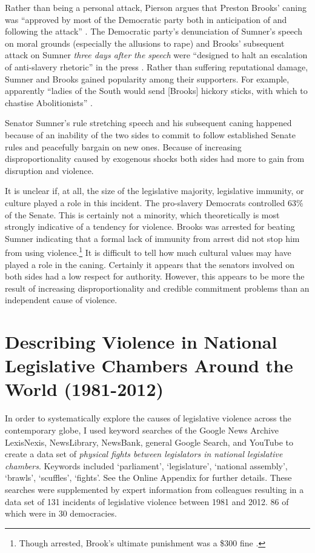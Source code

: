 \documentclass[a4paper]{article}\usepackage[]{graphicx}\usepackage[]{color}
\begin{document}
Rather than being a personal attack, Pierson argues that Preston Brooks' caning was ``approved by most of the Democratic party both in anticipation of and following the attack'' \cite[553]{Pierson1995}. The Democratic party's denunciation of Sumner's speech on moral grounds (especially the allusions to rape) and Brooks' subsequent attack on Sumner \emph{three days after the speech} were ``designed to halt an escalation of anti-slavery rhetoric'' in the press \cite[553]{Pierson1995}. Rather than suffering reputational damage, Sumner and Brooks gained popularity among their supporters. For example, apparently ``ladies of the South would send [Brooks] hickory sticks, with which to chastise Abolitionists'' \cite[255]{Donald2009}.

Senator Sumner's rule stretching speech and his subsequent caning happened because of an inability of the two sides to commit to follow established Senate rules and peacefully bargain on new ones. Because of increasing disproportionality caused by exogenous shocks both sides had more to gain from disruption and violence.

It is unclear if, at all, the size of the legislative majority, legislative immunity, or culture played a role in this incident. The pro-slavery Democrats controlled 63\% of the Senate. This is certainly not a minority, which theoretically is most strongly indicative of a tendency for violence. Brooks was arrested for beating Sumner indicating that a formal lack of immunity from arrest did not stop him from using violence.\footnote{Though arrested, Brook's ultimate punishment was a \$300 fine \cite[59]{Wolfe2004}.} It is difficult to tell how much cultural values may have played a role in the caning. Certainly it appears that the senators involved on both sides had a low respect for authority. However, this appears to be more the result of increasing disproportionality and credible commitment problems than an independent cause of violence.

\section*{Describing Violence in National Legislative Chambers Around the World (1981-2012)}

In order to systematically explore the causes of legislative violence across the contemporary globe, I used keyword searches of the Google News Archive LexisNexis, NewsLibrary, NewsBank, general Google Search, and YouTube to create a data set of {\emph{physical fights between legislators in national legislative chambers}}. Keywords included `parliament', `legislature', `national assembly', `brawls', `scuffles', `fights'. See the Online Appendix for further details. These searches were supplemented by expert information from colleagues resulting in a data set of 131 incidents of legislative violence between 1981 and 2012. 86 of which were in 30 democracies.
\end{document}

